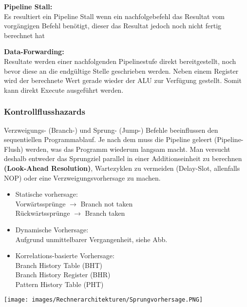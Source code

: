 \textbf{Pipeline Stall:}\\
Es resultiert ein Pipeline Stall wenn ein nachfolgebefehl das Resultat vom vorgängigen Befehl benötigt, dieser das Resultat jedoch noch nicht fertig berechnet hat

\textbf{Data-Forwarding:}\\
Resultate werden einer nachfolgenden Pipelinestufe direkt bereitgestellt, noch bevor diese an die endgültige Stelle geschrieben werden.
Neben einem Register wird der berechnete Wert gerade wieder der ALU zur Verfügung gestellt.
Somit kann direkt Execute ausgeführt werden.
\vspace{-0.5cm}
\subsubsection{Kontrollflusshazards}
Verzweigungs- (Branch-) und Sprung- (Jump-) Befehle beeinflussen den sequentiellen Programmablauf.
Je nach dem muss die Pipeline geleert (Pipeline-Flush) werden, was das Programm wiederum langsam macht.
Man versucht deshalb entweder das Sprungziel parallel in einer Additionseinheit zu berechnen \textbf{(Look-Ahead Resolution)}, Wartezyklen zu vermeiden (Delay-Slot, allenfalls NOP) oder eine Verzweigungsvorhersage zu machen.

	
	\begin{minipage}{0.55\textwidth}
		\begin{itemize}[noitemsep,topsep=0pt]
			\item Statische vorhersage:\\
			 Vorwärtssprünge $\rightarrow$ Branch not taken\\ Rückwärtssprünge $\rightarrow$ Branch taken
			 
			 \item Dynamische Vorhersage:\\
			 Aufgrund unmittelbarer Vergangenheit, siehe Abb.
			 
			 \item Korrelations-basierte Vorhersage:\\
			 Branch History Table (BHT)\\
			 Branch History Register (BHR)\\
			 Pattern History Table (PHT)

		\end{itemize}		
	\end{minipage}	
	\begin{minipage}{0.4\textwidth} 
		\texttt{[image: images/Rechnerarchitekturen/Sprungvorhersage.PNG]}
	\end{minipage}
	

